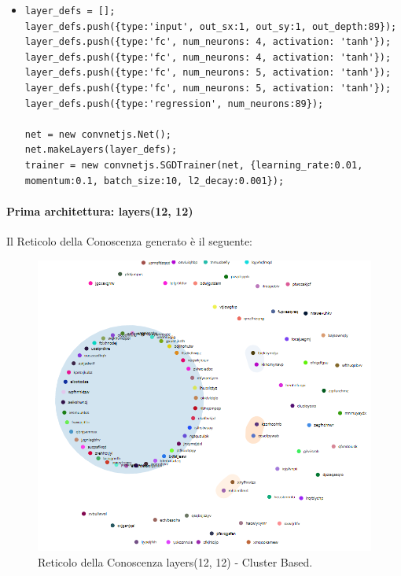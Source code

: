 \begin{itemize}
\item \begin{verbatim}
layer_defs = [];
layer_defs.push({type:'input', out_sx:1, out_sy:1, out_depth:89});
layer_defs.push({type:'fc', num_neurons: 4, activation: 'tanh'});
layer_defs.push({type:'fc', num_neurons: 4, activation: 'tanh'});
layer_defs.push({type:'fc', num_neurons: 5, activation: 'tanh'});
layer_defs.push({type:'fc', num_neurons: 5, activation: 'tanh'});
layer_defs.push({type:'regression', num_neurons:89});
        
net = new convnetjs.Net();
net.makeLayers(layer_defs);
trainer = new convnetjs.SGDTrainer(net, {learning_rate:0.01, 
momentum:0.1, batch_size:10, l2_decay:0.001});
\end{verbatim}
\end{itemize}

\paragraph{Prima architettura: layers(12, 12)}\mbox{}
\label{Prima architettura}
\noindent
Il Reticolo della Conoscenza generato è il seguente:
\begin{figure}[H]
\centering
	\includegraphics[width=0.70\linewidth]{./image/logica(12,12).png}
	\caption{Reticolo della Conoscenza layers(12, 12) - Cluster Based.}
	\label{Reticolo della Conoscenza layers(12, 12) - Cluster Based.}
\end{figure}
\noindent

